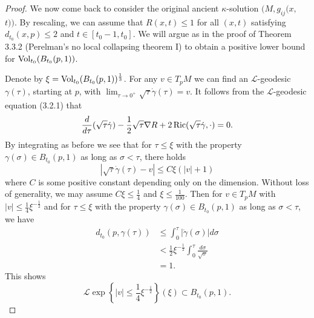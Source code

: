 \begin{proof}
We now come back to consider the original ancient
$\kappa$-solution $(M,g_{ij}(x,$ $t))$. By rescaling, we can
assume that $R(x,t)\le 1$ for all $(x,t)$ satisfying
$d_{t_0}(x,p)\le 2$ and $t\in[t_0-1,t_0]$. We will argue as in the
proof of Theorem 3.3.2 (Perelman's no local collapsing theorem I)
to obtain a positive lower bound for $\operatorname{Vol}_{t_0}(B_{t_0}(p,1))$.

Denote by $\xi=\operatorname{Vol}_{t_0}(B_{t_0}(p,1))^\frac{1}{3}$. For any
$v\in T_pM$ we can find an $\mathcal{L}$-geodesic $\gamma(\tau)$,
starting at $p$, with $\lim_{\tau\rightarrow
0^+}\sqrt{\tau}\dot{\gamma}(\tau)=v.$ It follows from the
$\mathcal{L}$-geodesic equation (3.2.1) that
$$
\frac{d}{d\tau}(\sqrt{\tau}\dot{\gamma})
-\frac{1}{2}\sqrt{\tau}\nabla
R+2\operatorname{Ric}(\sqrt{\tau}\dot{\gamma},\cdot)=0.
$$
By integrating as before we see that for $\tau\le\xi$ with the
property $\gamma(\sigma)\in B_{t_0}(p,1)$ as long as
$\sigma<\tau$, there holds
$$
|\sqrt{\tau}\dot{\gamma}(\tau)-v|\le C\xi (|v|+1)
$$
where $C$ is some positive constant depending only on the
dimension. Without loss of generality, we may assume
$C\xi\le\frac{1}{4}$ and $\xi\le\frac{1}{100}$. Then for $v\in
T_pM$ with $|v|\le\frac{1}{4}\xi^{-\frac{1}{2}}$ and for
$\tau\le\xi$ with the property $\gamma(\sigma)\in B_{t_0}(p,1)$ as
long as $\sigma<\tau$, we have
\begin{align*}
d_{t_0}(p,\gamma(\tau))
&  \le \int_0^\tau|\dot{\gamma}(\sigma)|d\sigma\\
&  < \frac{1}{2}\xi^{-\frac{1}{2}}
\int_0^\tau\frac{d\sigma}{\sqrt{\sigma}}\\
&  = 1.
\end{align*}
This shows \begin{equation}
\mathcal{L}\exp\left\{|v|\le\frac{1}{4}\xi^{-\frac{1}{2}}\right\}(\xi)
\subset B_{t_0}(p,1). %
\end{equation}


\end{proof}
